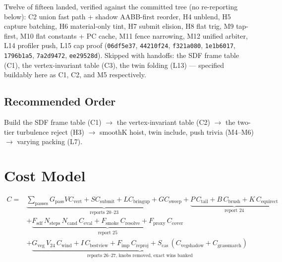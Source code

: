 \documentclass[11pt,a4paper]{article}
\begin{document}
Twelve of fifteen landed, verified against the committed tree (no
re-reporting below): C2 union fast path + shadow AABB-first reorder,
H4 unblend, H5 capture batching, H6 material-only tint, H7 submit elision,
H8 flat trig, M9 tap-first, M10 flat constants + PC cache, M11 fence
narrowing, M12 unified arbiter, L14 profiler push, L15 cap proof
(\texttt{06df5e37}, \texttt{44210f24}, \texttt{f321a080},
\texttt{1e1b6017}, \texttt{1796b1a5}, \texttt{7a2d9472},
\texttt{ee29528d}). Skipped with handoffs: the SDF frame table (C1),
the vertex-invariant table (C3), the twin folding (L13) --- specified
buildably here as C1, C2, and M5 respectively.

\subsection{Recommended Order}

Build the SDF frame table (C1) $\rightarrow$ the vertex-invariant table
(C2) $\rightarrow$ the two-tier turbulence reject (H3) $\rightarrow$
smoothK hoist, twin include, push trivia (M4--M6) $\rightarrow$ varying
packing (L7).

\section{Cost Model}

\begin{equation}
\begin{aligned}
C = &\underbrace{\sum_{\mathrm{passes}} G_{\mathrm{pass}} V C_{\mathrm{vert}} + S C_{\mathrm{submit}} + L C_{\mathrm{bringup}} + G C_{\mathrm{sweep}}}_{\text{reports 20--23}} + \underbrace{P\,C_{\mathrm{tail}} + B\,C_{\mathrm{brush}} + K\,C_{\mathrm{equirect}}}_{\text{report 24}} \\
&+ \underbrace{F_{\mathrm{sdf}}\,N_{\mathrm{steps}}\,N_{\mathrm{cand}}\,C_{\mathrm{eval}} + F_{\mathrm{smoke}}\,C_{\mathrm{resolve}} + F_{\mathrm{proxy}}\,C_{\mathrm{cover}}}_{\text{report 25}} \\
&+ \underbrace{G_{\mathrm{veg}}\,V_{24}\,C_{\mathrm{wind}} + I\,C_{\mathrm{bestview}} + F_{\mathrm{imp}}\,C_{\mathrm{reproj}} + S_{\mathrm{cas}}\,(C_{\mathrm{vegshadow}} + C_{\mathrm{grassmarch}})}_{\text{reports 26--27, knobs removed, exact wins banked}}
\end{aligned}
\end{equation}
\end{document}
